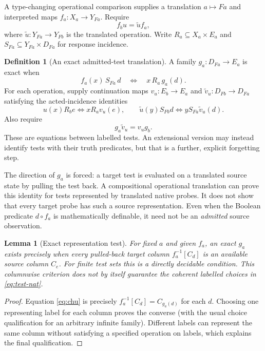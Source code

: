 \documentclass[11pt]{article}
\newtheorem{lemma}[theorem]{Lemma}
\theoremstyle{definition}\newtheorem{definition}[theorem]{Definition}
\theoremstyle{remark}\newtheorem{remark}[theorem]{Remark}
\begin{document}
A type-changing operational comparison supplies a translation $a\mapsto Fa$
and interpreted maps $f_a:X_a\to Y_{Fa}$. Require
\begin{equation}\label{eq:state-nat}
 f_bu=\widetilde u f_a,
\end{equation}
where $\widetilde u:Y_{Fa}\to Y_{Fb}$ is the translated operation.
Write $R_a\subseteq X_a\times E_a$ and
$S_{Fa}\subseteq Y_{Fa}\times D_{Fa}$ for response incidence.

\begin{definition}[An exact admitted-test translation]
A family $g_a:D_{Fa}\to E_a$ is exact when
\begin{equation}\label{eq:chu}
 f_a(x)\,S_{Fa}\,d\quad\Longleftrightarrow\quad x\,R_a\,g_a(d).
\end{equation}
For each operation, supply continuation maps $v_u:E_b\to E_a$ and
$\widetilde v_u:D_{Fb}\to D_{Fa}$ satisfying the acted-incidence identities
\[
 u(x)R_b e\Longleftrightarrow xR_av_u(e),\qquad
 \widetilde u(y)S_{Fb}d\Longleftrightarrow yS_{Fa}\widetilde v_u(d).
\]
Also require
\begin{equation}\label{eq:test-nat}
 g_a\widetilde v_u=v_ug_b.
\end{equation}
These are equations between labelled tests. An extensional version may instead
identify tests with their truth predicates, but that is a further, explicit
forgetting step.
\end{definition}

The direction of $g_a$ is forced: a target test is evaluated on a translated
source state by pulling the test back. A compositional operational translation
can prove this identity for tests represented by translated native probes.
It does not show that every target probe has such a source representation.
Even when the Boolean predicate $d\circ f_a$ is mathematically definable,
it need not be an \emph{admitted} source observation.

\begin{lemma}[Exact representation test]\label{lem:test-representation}
For fixed $a$ and given $f_a$, an exact $g_a$ exists precisely when every
pulled-back target column $f_a^{-1}[C_d]$ is an available source column $C_e$.
For finite test sets this is a directly decidable condition. This columnwise
criterion does not by itself guarantee the coherent labelled choices in
\eqref{eq:test-nat}.
\end{lemma}
\begin{proof}
Equation \eqref{eq:chu} is precisely $f_a^{-1}[C_d]=C_{g_a(d)}$ for each $d$.
Choosing one representing label for each column proves the converse (with the
usual choice qualification for an arbitrary infinite family). Different labels
can represent the same column without satisfying a specified operation on
labels, which explains the final qualification.
\end{proof}
\end{document}
